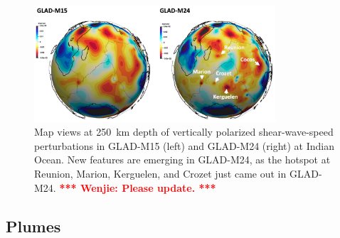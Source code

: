 \documentclass[extra,mreferee]{gji}
\newcommand{\red}[1]{\textbf{\textcolor{Red}{#1}}}
\newcommand{\towenjie}[1]{\textbf{\red{*** Wenjie: #1 ***}}}
\begin{document}
\begin{figure}
  \centering
  \includegraphics[width=0.8\textwidth]{./figures/M24-Reunion.png}
  \caption{\small{Map views at 250~km depth of vertically polarized shear-wave-speed perturbations in GLAD-M15 (left) and GLAD-M24 (right) at Indian Ocean. New features are emerging in GLAD-M24, as the hotspot at Reunion, Marion, Kerguelen, and Crozet just came out in GLAD-M24. \towenjie{Please update.} }}
  \label{fig:M24-Reunion}
\end{figure}

\subsection{Plumes}
\label{section:plumes}
\end{document}
